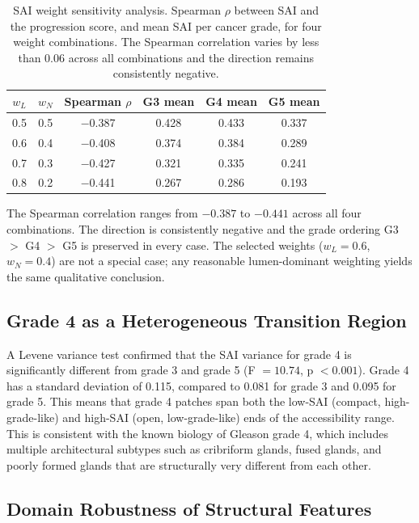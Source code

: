 \documentclass[12pt, a4paper]{article}
\begin{document}
\begin{table}[H]
\centering
\caption{SAI weight sensitivity analysis. Spearman $\rho$ between SAI and the
progression score, and mean SAI per cancer grade, for four weight combinations.
The Spearman correlation varies by less than 0.06 across all combinations and
the direction remains consistently negative.}
\label{tab:sai_sensitivity}
\begin{tabular}{cccccc}
\toprule
$w_L$ & $w_N$ & \textbf{Spearman $\rho$} & \textbf{G3 mean} & \textbf{G4 mean} & \textbf{G5 mean} \\
\midrule
0.5 & 0.5 & $-$0.387 & 0.428 & 0.433 & 0.337 \\
0.6 & 0.4 & $-$0.408 & 0.374 & 0.384 & 0.289 \\
0.7 & 0.3 & $-$0.427 & 0.321 & 0.335 & 0.241 \\
0.8 & 0.2 & $-$0.441 & 0.267 & 0.286 & 0.193 \\
\bottomrule
\end{tabular}
\end{table}

The Spearman correlation ranges from $-0.387$ to $-0.441$ across all four
combinations. The direction is consistently negative and the grade ordering
G3 $>$ G4 $>$ G5 is preserved in every case. The selected weights
($w_L = 0.6$, $w_N = 0.4$) are not a special case; any reasonable lumen-dominant
weighting yields the same qualitative conclusion.

\subsection{Grade 4 as a Heterogeneous Transition Region}

A Levene variance test confirmed that the SAI variance for grade 4 is
significantly different from grade 3 and grade 5 (F $= 10.74$, p $< 0.001$).
Grade 4 has a standard deviation of 0.115, compared to 0.081 for grade 3 and
0.095 for grade 5. This means that grade 4 patches span both the low-SAI
(compact, high-grade-like) and high-SAI (open, low-grade-like) ends of the
accessibility range. This is consistent with the known biology of Gleason grade 4,
which includes multiple architectural subtypes such as cribriform glands, fused
glands, and poorly formed glands that are structurally very different from each
other.

\subsection{Domain Robustness of Structural Features}
\end{document}
